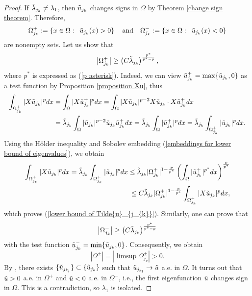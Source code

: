 \documentclass[a4paper,12pt,reqno]{amsart}
\renewcommand\eqref[1]{(\ref{#1})} %
\numberwithin{equation}{section}
\theoremstyle{plain}
\theoremstyle{definition}
\begin{document}
\begin{proof}
If  $\Tilde{\lambda}_{j_{k}} \neq \lambda_{1}$, then $\Tilde{u}_{j_{k}}$ changes signs in $\Omega$ by Theorem \ref{change sign theorem}. Therefore, $$\Omega_{j_{k}}^{+}:=\left\{x\in\Omega: \enspace \Tilde{u}_{j_{k}}(x)>0\right\}\quad \text{and} \quad \Omega_{j_{k}}^{-}:=\left\{x\in\Omega: \enspace \Tilde{u}_{j_{k}}(x)<0\right\}$$ 
are nonempty sets. Let us show that
\begin{equation}\label{lower bound of Tilde{u}_{j_{k}}}
    \left|\Omega_{j_{k}}^{+}\right| \geq \left(C\Tilde{\lambda}_{j_{k}}\right)^{\frac{p^{*}}{p^{*}-p}},
\end{equation}
where $p^{*}$ is expressed as \eqref{p asterisk}. Indeed, we can view  $\Tilde{u}_{j_{k}}^{+}=\max\{\Tilde{u}_{j_{k}}, 0\}$
as a test function by Proposition \ref{proposition Xu}, thus
\begin{equation*}
\begin{aligned}
\int_{\Omega_{j_{k}}^{+}}|X \Tilde{u}_{j_{k}}|^{p} d x &=\int_{\Omega}|X \Tilde{u}_{j_{k}}^{+}|^{p} d x=\int_{\Omega}|X \Tilde{u}_{j_{k}}|^{p-2} X \Tilde{u}_{j_{k}} \cdot X \Tilde{u}_{j_{k}}^{+} d x\\
&=\Tilde{\lambda}_{j_{k}} \int_{\Omega}|\Tilde{u}_{j_{k}}|^{p-2} \Tilde{u}_{j_{k}} \Tilde{u}_{j_{k}}^{+} d x=\Tilde{\lambda}_{j_{k}}\int_{\Omega}|\Tilde{u}_{j_{k}}^{+}|^{p} d x=\Tilde{\lambda}_{j_{k}}\int_{\Omega_{j_{k}}^{+}}|\Tilde{u}_{j_{k}}|^{p} d x.
\end{aligned}
\end{equation*}
Using the H\"older inequality and  Sobolev embedding \eqref{embeddings for lower bound of eigenvalues}, we obtain
\begin{equation*}
\begin{aligned}
\int_{\Omega_{j_{k}}^{+}}|X \Tilde{u}_{j_{k}}|^{p} d x= \Tilde{\lambda}_{j_{k}}\int_{\Omega_{j_{k}}^{+}}|\Tilde{u}_{j_{k}}|^{p} d x\leq \Tilde{\lambda}_{j_{k}}|\Omega_{j_{k}}^{+}|^{1-\frac{p}{p^{*}}}\left(\int_{\Omega}|\Tilde{u}_{j_{k}}^{+}|^{p^{*}}dx\right)^{\frac{p}{p^{*}}}\\
\leq C\Tilde{\lambda}_{j_{k}}|\Omega_{j_{k}}^{+}|^{1-\frac{p}{p^{*}}}\int_{\Omega_{j_{k}}^{+}}|X \Tilde{u}_{j_{k}}|^{p} d x,
\end{aligned}
\end{equation*}
which proves \eqref{lower bound of Tilde{u}_{j_{k}}}. Similarly, one can prove that
\begin{equation*}
\left|\Omega_{j_{k}}^{-}\right| \geq \left(C\Tilde{\lambda}_{j_{k}}\right)^{\frac{p^{*}}{p^{*}-p}} 
\end{equation*}
with the test function $\Tilde{u}_{j_{k}}^{-}=\min\{\Tilde{u}_{j_{k}}, 0\}$.
Consequently, we obtain
$$\left|\Omega^{\pm}\right|=\left|\limsup\Omega_{j_{k}}^{\pm}\right|> 0.$$ 
By \cite[Theorem 4.9]{Bre2011},  there exists $\{\Tilde{u}_{j_{k_{l}}}\}\subset \{\Tilde{u}_{j_{k}}\}$ such that $\Tilde{u}_{j_{k_{l}}}\to \Tilde{u}$ a.e. in $\Omega$. It turns out that $\Tilde{u}>0$ a.e. in $\Omega^{+}$ and $\Tilde{u}<0$ a.e. in $\Omega^{-}$, i.e., the first eigenfunction $\Tilde{u}$ changes sign in $\Omega$. This is a contradiction, so $\lambda_{1}$ is isolated.
\end{proof}
\end{document}
